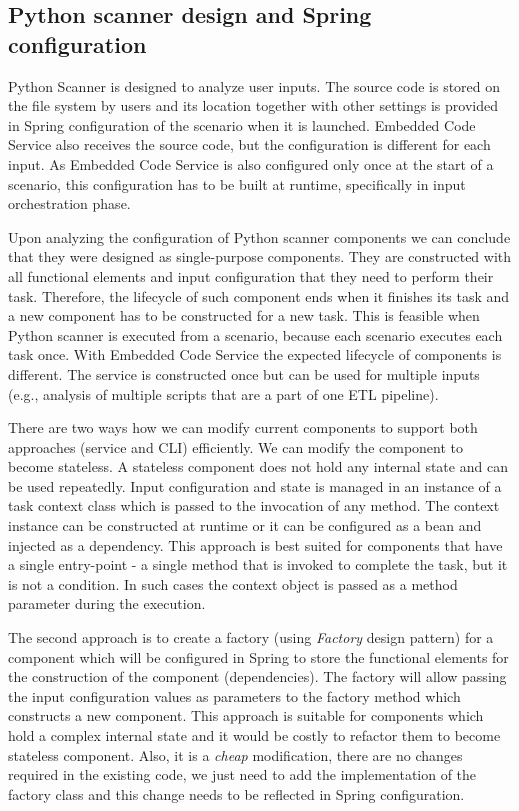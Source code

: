 \subsection{Python scanner design and Spring configuration}
Python Scanner is designed to analyze user inputs. The source code is stored on the file system by users and its location together with other settings is provided in Spring configuration of the scenario when it is launched. Embedded Code Service also receives the source code, but the configuration is different for each input. As Embedded Code Service is also configured only once at the start of a scenario, this configuration has to be built at runtime, specifically in input orchestration phase. 
\par
Upon analyzing the configuration of Python scanner components we can conclude that they were designed as single-purpose components. They are constructed with all functional elements and input configuration that they need to perform their task. Therefore, the lifecycle of such component ends when it finishes its task and a new component has to be constructed for a new task. This is feasible when Python scanner is executed from a scenario, because each scenario executes each task once. With Embedded Code Service the expected lifecycle of components is different. The service is constructed once but can be used for multiple inputs (e.g., analysis of multiple scripts that are a part of one ETL pipeline).
\par
There are two ways how we can modify current components to support both approaches (service and CLI) efficiently. We can modify the component to become stateless. A stateless component does not hold any internal state and can be used repeatedly. Input configuration and state is managed in an instance of a task context class which is passed to the invocation of any method. The context instance can be constructed at runtime or it can be configured as a bean and injected as a dependency. This approach is best suited for components that have a single entry-point - a single method that is invoked to complete the task, but it is not a condition. In such cases the context object is passed as a method parameter during the execution.
\par
The second approach is to create a factory (using \textit{Factory} design pattern) for a component which will be configured in Spring to store the functional elements for the construction of the component (dependencies). The factory will allow passing the input configuration values as parameters to the factory method which constructs a new component. This approach is suitable for components which hold a complex internal state and it would be costly to refactor them to become stateless component. Also, it is a \textit{cheap} modification, there are no changes required in the existing code, we just need to add the implementation of the factory class and this change needs to be reflected in Spring configuration.

